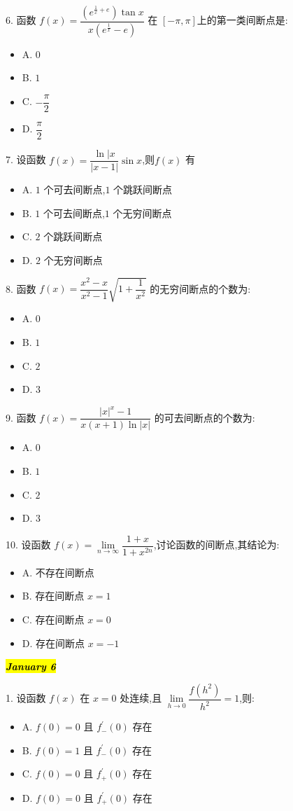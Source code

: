 6. 函数 $f(x)=\dfrac{(e^{\frac{1}{x}+e})\tan x}{x(e^{\frac{1}{x}}-e)}$ 在 $[-\pi,\pi]$上的第一类间断点是:
\begin{itemize}
	\item A. $0$
	\item B. $1$
	\item C. $-\dfrac{\pi}{2}$
	\item D. $\dfrac{\pi}{2}$
\end{itemize}

7. 设函数 $f(x)=\dfrac{\ln|x}{|x-1|}\sin x$,则$f(x)$ 有
\begin{itemize}
	\item A. $1$ 个可去间断点,$1$ 个跳跃间断点
	\item B. $1$ 个可去间断点,$1$ 个无穷间断点
	\item C. $2$ 个跳跃间断点
	\item D. $2$ 个无穷间断点
\end{itemize}

8. 函数 $f(x)=\dfrac{x^{2}-x}{x^{2}-1}\sqrt{1+\dfrac{1}{x^{2}}}$ 的无穷间断点的个数为:
\begin{itemize}
	\item A. $0$
	\item B. $1$
	\item C. $2$
	\item D. $3$
\end{itemize}

9. 函数 $f(x)=\dfrac{|x|^{x}-1}{x(x+1)\ln|x|}$ 的可去间断点的个数为:
\begin{itemize}
	\item A. $0$
	\item B. $1$
	\item C. $2$
	\item D. $3$
\end{itemize}

10. 设函数 $f(x)=\lim\limits_{n\to \infty}\dfrac{1+x}{1+x^{2n}}$,讨论函数的间断点,其结论为:
\begin{itemize}
	\item A. 不存在间断点
	\item B. 存在间断点 $x=1$
	\item C. 存在间断点 $x=0$
	\item D. 存在间断点 $x=-1$
\end{itemize}

\hl{\textbf{\textit{January 6}}}

1. 设函数 $f(x)$ 在 $x=0$ 处连续,且 $\lim\limits_{h\to 0}\dfrac{f(h^{2})}{h^{2}}=1$,则:
\begin{itemize}
	\item A. $f(0)=0$ 且 $f_{-}^{'}(0)$ 存在
	\item B. $f(0)=1$ 且 $f_{-}^{'}(0)$ 存在
	\item C. $f(0)=0$ 且 $f_{+}^{'}(0)$ 存在
	\item D. $f(0)=0$ 且 $f_{+}^{'}(0)$ 存在
\end{itemize}

